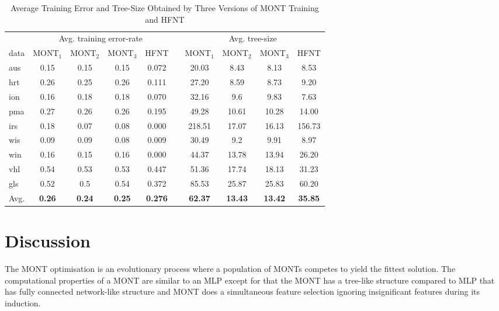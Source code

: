 \documentclass[conference]{IEEEtran}
\begin{document}
\begin{table}
    \begin{center}
        \renewcommand{\arraystretch}{1.1}
        \setlength{\tabcolsep}{1pt}
        {\caption{Average Training Error and Tree-Size Obtained by Three Versions of MONT Training and HFNT}
            \label{tab:tree_error_size}}
        \begin{tabular}{lccccccccc}
            \hline
            &  \multicolumn{4}{c}{Avg. training error-rate} & & \multicolumn{4}{c}{Avg. tree-size}\\
            \cline{2-5}  \cline{7-10} 
            data & MONT$_1$ & MONT$_2$ & MONT$_3$ & HFNT & & MONT$_1$ & MONT$_2$ & MONT$_3$  & HFNT \\
            \hline
            aus & 0.15 & 0.15 & 0.15 & 0.072 & &  20.03 & 8.43 & 8.13 & 8.53 \\
            hrt & 0.26 & 0.25 & 0.26 & 0.111 & & 27.20 & 8.59 & 8.73 & 9.20 \\
            ion & 0.16 & 0.18 & 0.18 & 0.070 & & 32.16 & 9.6 & 9.83 & 7.63 \\
            pma & 0.27 & 0.26 & 0.26 & 0.195 & & 49.28 & 10.61 & 10.28 & 14.00 \\
            irs & 0.18 & 0.07 & 0.08 & 0.000 & & 218.51 & 17.07 & 16.13 & 156.73 \\
            wis & 0.09 & 0.09 & 0.08 & 0.009 & & 30.49 & 9.2 & 9.91 & 8.97 \\
            win & 0.16 & 0.15 & 0.16 & 0.000 & & 44.37 & 13.78 & 13.94 & 26.20 \\
            vhl & 0.54 & 0.53 & 0.53 & 0.447 & & 51.36 & 17.74 & 18.13 & 31.23 \\
            gls & 0.52 & 0.5 & 0.54 & 0.372 & & 85.53 & 25.87 & 25.83 & 60.20 \\
            \hline
            Avg. & \textbf{0.26} & \textbf{0.24} & \textbf{0.25} & \textbf{0.276} & & \textbf{62.37} & \textbf{13.43} & \textbf{13.42} & \textbf{35.85} \\
            \hline
        \end{tabular}
    \end{center}
\end{table}


\section{Discussion}
\label{sec:dis}
The MONT optimisation is an evolutionary process where a population of MONTs competes to yield the fittest solution. The computational properties of a MONT are similar to an MLP except for that the MONT has a tree-like structure compared to MLP that has fully connected network-like structure and MONT does a simultaneous feature selection ignoring insignificant features during its induction.
\end{document}
